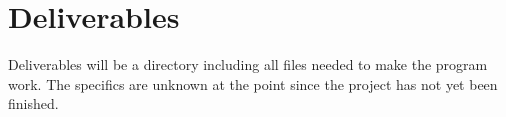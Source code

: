 \section{Deliverables}

Deliverables will be a directory including all files needed to make the program work.
The specifics are unknown at the point since the project has not yet been finished.